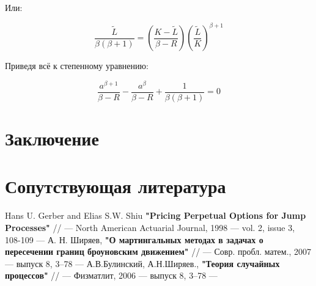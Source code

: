 \documentclass[a4paper,12pt]{article}
\theoremstyle{definition}
\begin{document}
Или:

\begin{equation*}
    \frac{\tilde{L}}{\beta (\beta + 1)} = \left( \frac{K - \tilde{L}}{\beta - R} \right) \left( \frac{\tilde{L}}{K} \right)^{\beta + 1}
\end{equation*}

Приведя всё к степенному уравнению:

\begin{equation*}
    \frac{a^{\beta + 1}}{\beta - R} - \frac{a^{\beta}}{\beta - R} + \frac{1}{\beta (\beta + 1)} = 0
\end{equation*}

\section{Заключение}

\section{Сопутствующая литература}

\begin{thebibliography}{3}
Hans U. Gerber and Elias S.W. Shiu \textbf{"Pricing Perpetual Options for Jump Processes"} // --- North American Actuarial Journal, 1998 --- vol. 2, issue 3, 108-109 ---
А. Н. Ширяев, \textbf{"О мартингальных методах в задачах о пересечении границ броуновским движением"} // --- Совр. пробл. матем., 2007 --- выпуск 8, 3–78 ---
А.В.Булинский, А.Н.Ширяев., \textbf{"Теория случайных процессов"} // --- Физматлит, 2006 --- выпуск 8, 3–78 ---
\end{thebibliography}

\appendix
\end{document}
